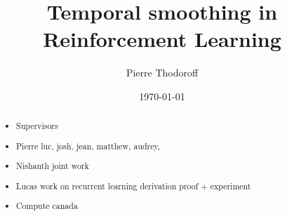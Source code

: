 \documentclass[12pt, oneside, extrafontsizes]{memoir}
\begin{document}

\pretitle{\begin{center}\cftchapterfont\huge}
\posttitle{\end{center}}
\preauthor{\begin{center}\huge}
\postauthor{\end{center}}
\predate{\begin{center}\large}
\postdate{\end{center}}

\title{Temporal smoothing in Reinforcement Learning}
\author{Pierre Thodoroff}
\date{\today}
\renewcommand\maketitlehookb{
\vfill
}
\renewcommand\maketitlehookc{
\vfill
\begin{center}
{
\large
Computer Science\\
McGill University, Montreal
}
\end{center}
\vspace{10mm}
}
\renewcommand\maketitlehookd{
\vspace{10mm}
A thesis submitted to McGill University in partial fulfilment of the requirements of
the degree of Master of Science.
\copyright Pierre Thodoroff; \today.
}

\begin{titlingpage}
\maketitle
\end{titlingpage}


\clearpage
{}
\renewcommand{\abstractname}{Acknowledgements}
\begin{abstract}
\begin{itemize}
	\item Supervisors
	\item Pierre luc, josh, jean, matthew, audrey, 
	\item Nishanth joint work
	\item Lucas work on recurrent learning derivation proof + experiment
	\item Compute canada
\end{itemize}
\end{abstract}
\end{document}

